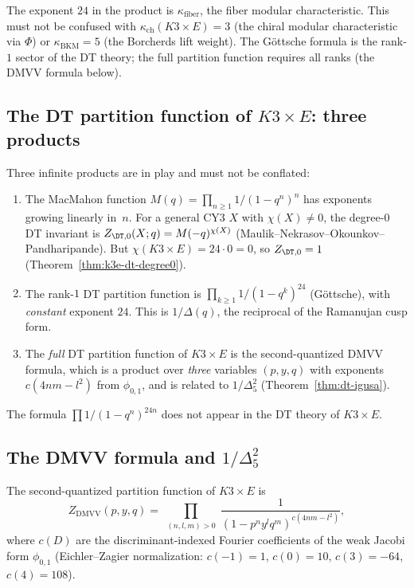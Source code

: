 The exponent $24$ in the product is $\kappa_{\mathrm{fiber}}$, the fiber modular characteristic. This must not be confused with $\kappa_{\mathrm{ch}}(K3 \times E) = 3$ (the chiral modular characteristic via $\Phi$) or $\kappa_{\mathrm{BKM}} = 5$ (the Borcherds lift weight). The G\"ottsche formula is the rank-$1$ sector of the DT theory; the full partition function requires all ranks (the DMVV formula below).

\subsection{The DT partition function of $K3 \times E$: three products}
\label{subsec:k3e-dt-three-products}

Three infinite products are in play and must not be conflated:

\begin{enumerate}[label=(\roman*)]
\item The MacMahon function $M(q) = \prod_{n \geq 1} 1/(1-q^n)^n$ has exponents growing linearly in~$n$. For a general CY3 $X$ with $\chi(X) \neq 0$, the degree-$0$ DT invariant is $Z_{\DT,0}(X; q) = M(-q)^{\chi(X)}$ (Maulik--Nekrasov--Okounkov--Pandharipande). But $\chi(K3 \times E) = 24 \cdot 0 = 0$, so $Z_{\DT,0} = 1$ (Theorem~\ref{thm:k3e-dt-degree0}).

\item The rank-$1$ DT partition function is $\prod_{k \geq 1} 1/(1-q^k)^{24}$ (G\"ottsche), with \emph{constant} exponent $24$. This is $1/\Delta(q)$, the reciprocal of the Ramanujan cusp form.

\item The \emph{full} DT partition function of $K3 \times E$ is the second-quantized DMVV formula, which is a product over \emph{three} variables $(p, y, q)$ with exponents $c(4nm - l^2)$ from $\phi_{0,1}$, and is related to $1/\Delta_5^2$ (Theorem~\ref{thm:dt-igusa}).
\end{enumerate}

The formula $\prod 1/(1-q^n)^{24n}$ does not appear in the DT theory of $K3 \times E$.

\subsection{The DMVV formula and $1/\Delta_5^2$}
\label{subsec:k3e-dmvv-vs-delta5}

\begin{theorem}
\label{thm:k3e-dmvv-product}
\ClaimStatusProvedElsewhere
The second-quantized partition function of $K3 \times E$ is
\begin{equation}\label{eq:k3e-dmvv}
 Z_{\mathrm{DMVV}}(p, y, q)
 = \prod_{\substack{(n, l, m) > 0}} \frac{1}{(1 - p^n y^l q^m)^{c(4nm - l^2)}},
\end{equation}
where $c(D)$ are the discriminant-indexed Fourier coefficients of the weak Jacobi form $\phi_{0,1}$ (Eichler--Zagier normalization: $c(-1) = 1$, $c(0) = 10$, $c(3) = -64$, $c(4) = 108$).
\ClaimStatusProvedElsewhere
\end{theorem}

